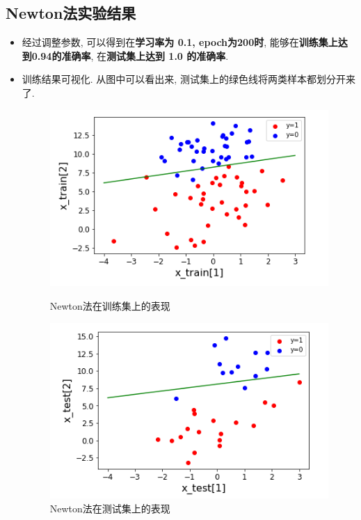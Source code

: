 \documentclass[UTF8]{article}
\begin{document}
\subsection{Newton法实验结果}
\begin{itemize}
	\item 经过调整参数, 可以得到在\textbf{学习率为 0.1, epoch为200时}, 能够在\textbf{训练集上达到0.94的准确率}, 在\textbf{测试集上达到 1.0 的准确率}.
	\item 训练结果可视化. 从图中可以看出来, 测试集上的绿色线将两类样本都划分开来了.
	\begin{figure}[H]
		\begin{minipage}[H]{0.5\linewidth}
			\centering
			\includegraphics[width=\linewidth]{newton_train.png}
			\caption{Newton法在训练集上的表现}
		\end{minipage}
		\begin{minipage}[H]{0.5\linewidth}
			\centering
			\includegraphics[width=\linewidth]{newton_test.png}
			\caption{Newton法在测试集上的表现}
		\end{minipage}
	\end{figure}
\end{itemize}
\end{document}
